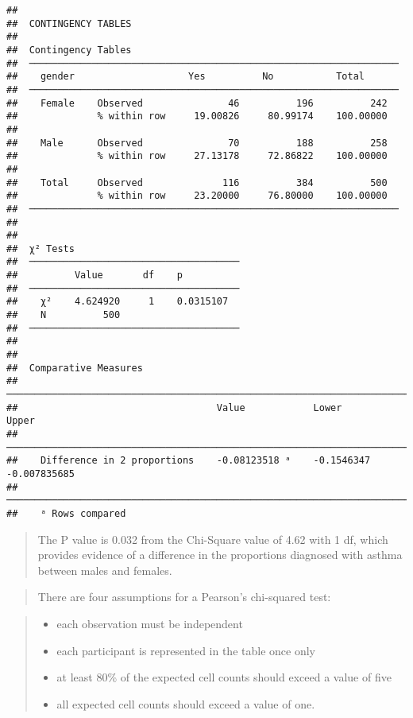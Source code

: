 \documentclass[
]{memoir}
\providecommand{\tightlist}{%
  \setlength{\itemsep}{0pt}\setlength{\parskip}{0pt}}
\begin{document}
\begin{verbatim}
## 
##  CONTINGENCY TABLES
## 
##  Contingency Tables                                                
##  ───────────────────────────────────────────────────────────────── 
##    gender                    Yes          No           Total       
##  ───────────────────────────────────────────────────────────────── 
##    Female    Observed               46          196          242   
##              % within row     19.00826     80.99174    100.00000   
##                                                                    
##    Male      Observed               70          188          258   
##              % within row     27.13178     72.86822    100.00000   
##                                                                    
##    Total     Observed              116          384          500   
##              % within row     23.20000     76.80000    100.00000   
##  ───────────────────────────────────────────────────────────────── 
## 
## 
##  χ² Tests                              
##  ───────────────────────────────────── 
##          Value       df    p           
##  ───────────────────────────────────── 
##    χ²    4.624920     1    0.0315107   
##    N          500                      
##  ───────────────────────────────────── 
## 
## 
##  Comparative Measures                                                           
##  ────────────────────────────────────────────────────────────────────────────── 
##                                   Value            Lower         Upper          
##  ────────────────────────────────────────────────────────────────────────────── 
##    Difference in 2 proportions    -0.08123518 ᵃ    -0.1546347    -0.007835685   
##  ────────────────────────────────────────────────────────────────────────────── 
##    ᵃ Rows compared
\end{verbatim}

\begin{quote}
The P value is 0.032 from the Chi-Square value of 4.62 with 1 df, which provides evidence of a difference in the proportions diagnosed with asthma between males and females.
\end{quote}

\begin{quote}
There are four assumptions for a Pearson's chi-squared test:
\end{quote}

\begin{quote}
\begin{itemize}
\tightlist
\item
  each observation must be independent
\item
  each participant is represented in the table once only
\item
  at least 80\% of the expected cell counts should exceed a value of five
\item
  all expected cell counts should exceed a value of one.
\end{itemize}
\end{quote}
\end{document}
